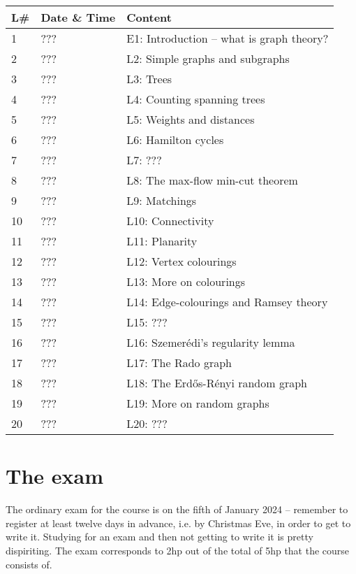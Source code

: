 \documentclass{tufte-handout}
\begin{document}
\begin{table}[h]
\begin{tabularx}{\textwidth}{llX}
L\# & Date \& Time      & Content \\ 
\midrule
1  & ??? & E1: Introduction -- what is graph theory?\\
2  & ??? & L2: Simple graphs and subgraphs\\
3  & ??? & L3: Trees\\
4  & ??? & L4: Counting spanning trees\\
5  & ??? & L5: Weights and distances\\
6  & ??? & L6: Hamilton cycles\\
7  & ??? & L7: ???\\
8  & ??? & L8: The max-flow min-cut theorem\\
9  & ??? & L9: Matchings\\
10 & ??? & L10: Connectivity\\
11 & ??? & L11: Planarity\\
12 & ??? & L12: Vertex colourings\\
13 & ??? & L13: More on colourings\\
14 & ??? & L14: Edge-colourings and Ramsey theory\\
15 & ??? & L15: ???\\
16 & ??? & L16: Szemerédi's regularity lemma\\
17 & ??? & L17: The Rado graph\\
18 & ??? & L18: The Erd\H{o}s-Rényi random graph\\
19 & ??? & L19: More on random graphs\\
20 & ??? & L20: ???
\end{tabularx}
\end{table}

\section{The exam}

The ordinary exam for the course is on the fifth of January 2024 -- remember to register at least twelve days in advance, i.e. by Christmas Eve, in order to get to write it. Studying for an exam and then not getting to write it is pretty dispiriting. The exam corresponds to 2hp out of the total of 5hp that the course consists of.
\end{document}

